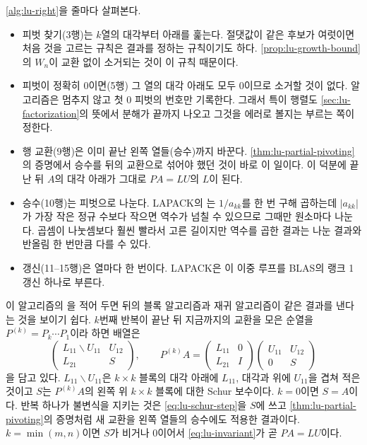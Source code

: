 \cref{alg:lu-right}을 줄마다 살펴본다.
\begin{itemize}
\item 피벗 찾기(3행)는 $k$열의 대각부터 아래를 훑는다. 절댓값이 같은 후보가 여럿이면 처음 것을 고르는 규칙은 결과를 정하는 규칙이기도 하다. \cref{prop:lu-growth-bound}의 $W_n$이 교환 없이 소거되는 것이 이 규칙 때문이다.
\item 피벗이 정확히 $0$이면(5행) 그 열의 대각 아래도 모두 $0$이므로 소거할 것이 없다. 알고리즘은 멈추지 않고 첫 $0$ 피벗의 번호만 기록한다. 그래서 특이 행렬도 \cref{sec:lu-factorization}의 뜻에서 분해가 끝까지 나오고 그것을 에러로 볼지는 부르는 쪽이 정한다.
\item 행 교환(9행)은 이미 끝난 왼쪽 열들(승수)까지 바꾼다. \cref{thm:lu-partial-pivoting}의 증명에서 승수를 뒤의 교환으로 섞어야 했던 것이 바로 이 일이다. 이 덕분에 끝난 뒤 $A$의 대각 아래가 그대로 $PA=LU$의 $L$이 된다.
\item 승수(10행)는 피벗으로 나눈다. LAPACK의 는 $1/a_{kk}$를 한 번 구해 곱하는데 $|a_{kk}|$가 가장 작은 정규 수보다 작으면 역수가 넘칠 수 있으므로 그때만 원소마다 나눈다. 곱셈이 나눗셈보다 훨씬 빨라서 고른 길이지만 역수를 곱한 결과는 나눈 결과와 반올림 한 번만큼 다를 수 있다.
\item 갱신(11--15행)은 열마다  한 번이다. LAPACK은 이 이중 루프를 BLAS의 랭크 1 갱신  하나로 부른다.
\end{itemize}

이 알고리즘의 을 적어 두면 뒤의 블록 알고리즘과 재귀 알고리즘이 같은 결과를 낸다는 것을 보이기 쉽다. $k$번째 반복이 끝난 뒤 지금까지의 교환을 모은 순열을 $P^{(k)}=P_k\cdots P_1$이라 하면 배열은
\begin{equation}
\label{eq:lu-invariant}
\begin{pmatrix}L_{11}\backslash U_{11}&U_{12}\\L_{21}&S\end{pmatrix},\qquad
P^{(k)}A=\begin{pmatrix}L_{11}&0\\L_{21}&I\end{pmatrix}\begin{pmatrix}U_{11}&U_{12}\\0&S\end{pmatrix}
\end{equation}
을 담고 있다. $L_{11}\backslash U_{11}$은 $k\times k$ 블록의 대각 아래에 $L_{11}$, 대각과 위에 $U_{11}$을 겹쳐 적은 것이고 $S$는 $P^{(k)}A$의 왼쪽 위 $k\times k$ 블록에 대한 Schur 보수이다. $k=0$이면 $S=A$이다. 반복 하나가 불변식을 지키는 것은 \eqref{eq:lu-schur-step}을 $S$에 쓰고 \cref{thm:lu-partial-pivoting}의 증명처럼 새 교환을 왼쪽 열들의 승수에도 적용한 결과이다. $k=\min(m,n)$이면 $S$가 비거나 $0$이어서 \eqref{eq:lu-invariant}가 곧 $PA=LU$이다.

